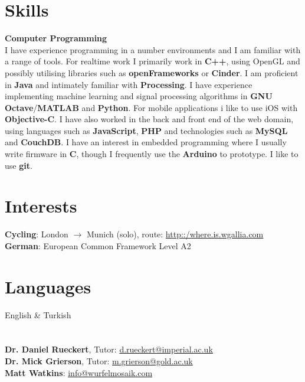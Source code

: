 \documentclass[margin,line,a4paper]{resume}
\begin{document}
\begin{resume}
\newpage
\section{\mysidestyle Skills}

\textbf{Computer Programming} \vspace{1mm} \\
I have experience programming in a number environments and I am
familiar with a range of tools. For realtime work I primarily work in
\textbf{C++}, using OpenGL and possibly utilising
libraries such as \textbf{openFrameworks} or \textbf{Cinder}. I am
proficient in \textbf{Java} and intimately familiar with
\textbf{Processing}. I have experience implementing machine learning
and signal processing algorithms in \textbf{GNU
  Octave}/\textbf{MATLAB} and \textbf{Python}. For mobile applications
i like to use iOS with \textbf{Objective-C}. I have also worked in the
back and front end of the web domain, using languages such as
\textbf{JavaScript}, \textbf{PHP} and technologies such as
\textbf{MySQL} and \textbf{CouchDB}. I have an interest in embedded
programming where I usually write firmware in \textbf{C}, though I
frequently use the \textbf{Arduino} to prototype. I like to use
\textbf{git}.

\section{\mysidestyle Interests}

\textbf{Cycling}: London $\rightarrow$ Munich (solo), route: \href{http::/where.is.wgallia.com}{http::/where.is.wgallia.com} \vspace{1mm} \\
\textbf{German}: European Common Framework Level A2

\section{\mysidestyle Languages}

English \& Turkish

\section{}

\hypersetup{urlcolor=Fuchsia}
%
\textbf{Dr. Daniel Rueckert}, Tutor: \href{mailto:d.rueckert@imperial.ac.uk}{d.rueckert@imperial.ac.uk}
\vspace{2mm} \\
\textbf{Dr. Mick Grierson}, Tutor: \href{mailto:m.grierson@gold.ac.uk}{m.grierson@gold.ac.uk}
\vspace{2mm} \\
\textbf{Matt Watkins}: \href{info@wurfelmosaik.com}{info@wurfelmosaik.com}
\vspace{2mm} \\

\end{resume}
\end{document}
